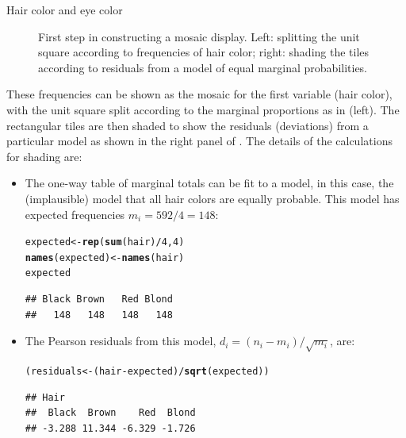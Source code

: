 \documentclass[11pt]{book}\usepackage[]{graphicx}\usepackage[]{color}
\makeatletter
\newcommand{\hlnum}[1]{\textcolor[rgb]{0.686,0.059,0.569}{#1}}%
\newcommand{\hlopt}[1]{\textcolor[rgb]{0,0,0}{#1}}%
\newcommand{\hlstd}[1]{\textcolor[rgb]{0.345,0.345,0.345}{#1}}%
\newcommand{\hlkwb}[1]{\textcolor[rgb]{0.69,0.353,0.396}{#1}}%
\newcommand{\hlkwd}[1]{\textcolor[rgb]{0.737,0.353,0.396}{\textbf{#1}}}%
\newenvironment{kframe}{%
 \def\at@end@of@kframe{}%
 \ifinner\ifhmode%
  \def\at@end@of@kframe{\end{minipage}}%
  \begin{minipage}{\columnwidth}%
 \fi\fi%
 \def\FrameCommand##1{\hskip\@totalleftmargin \hskip-\fboxsep
 \colorbox{shadecolor}{##1}\hskip-\fboxsep
     \hskip-\linewidth \hskip-\@totalleftmargin \hskip\columnwidth}%
 \MakeFramed {\advance\hsize-\width
   \@totalleftmargin\z@ \linewidth\hsize
   \@setminipage}}%
 {\par\unskip\endMakeFramed%
 \at@end@of@kframe}
\newenvironment{knitrout}{}{} %
\renewenvironment{knitrout}{\small\renewcommand{\baselinestretch}{.85}}{} %
\makeatother
\begin{document}
\begin{Example}[haireye2a]{Hair color and eye color}
\begin{knitrout}
\begin{figure}[htbp]
\caption[First step in constructing a mosaic display]{First step in constructing a mosaic display. Left: splitting the unit square according to frequencies of hair color; right: shading the tiles according to residuals from a model of equal marginal probabilities.\label{fig:haireye-mos4}}
\end{figure}


\end{knitrout}


These frequencies can be shown as the mosaic for the first variable (hair color),
with the unit square split according to the marginal proportions
as in  (left).
The rectangular tiles are then shaded to show the residuals (deviations)
from a particular model as shown in the right panel of .
The details of the calculations for shading are:

\begin{itemize}
\item The one-way table of marginal totals can be fit to a model, in this
case, the (implausible) model that all hair colors are equally probable.  This model
has expected frequencies $m_i = 592/4 = 148$:
\begin{knitrout}
\color{fgcolor}\begin{kframe}
\begin{alltt}
\hlstd{expected} \hlkwb{<-} \hlkwd{rep}\hlstd{(}\hlkwd{sum}\hlstd{(hair)}\hlopt{/}\hlnum{4}\hlstd{,} \hlnum{4}\hlstd{)}
\hlkwd{names}\hlstd{(expected)} \hlkwb{<-} \hlkwd{names}\hlstd{(hair)}
\hlstd{expected}
\end{alltt}
\begin{verbatim}
## Black Brown   Red Blond 
##   148   148   148   148
\end{verbatim}
\end{kframe}
\end{knitrout}

\item The Pearson residuals from this model, $d_i = ( n_i - m_i ) / \sqrt{m_i}$, are:
\begin{knitrout}
\color{fgcolor}\begin{kframe}
\begin{alltt}
\hlstd{(residuals} \hlkwb{<-} \hlstd{(hair} \hlopt{-} \hlstd{expected)} \hlopt{/} \hlkwd{sqrt}\hlstd{(expected))}
\end{alltt}
\begin{verbatim}
## Hair
##  Black  Brown    Red  Blond 
## -3.288 11.344 -6.329 -1.726
\end{verbatim}
\end{kframe}
\end{knitrout}


\end{itemize}
\end{Example}
\end{document}
